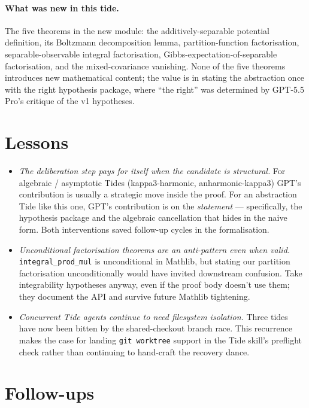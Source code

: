\documentclass[11pt]{article}
\begin{document}
\paragraph{What was new in this tide.} The five theorems in the new
module: the additively-separable potential definition, its Boltzmann
decomposition lemma, partition-function factorisation,
separable-observable integral factorisation,
Gibbs-expectation-of-separable factorisation, and the mixed-covariance
vanishing. None of the five theorems introduces new mathematical
content; the value is in stating the abstraction once with the right
hypothesis package, where ``the right'' was determined by GPT-5.5 Pro's
critique of the v1 hypotheses.

\section{Lessons}

\begin{itemize}
\item \emph{The deliberation step pays for itself when the candidate
is structural.} For algebraic / asymptotic Tides (kappa3-harmonic,
anharmonic-kappa3) GPT's contribution is usually a strategic move
inside the proof. For an abstraction Tide like this one, GPT's
contribution is on the \emph{statement} --- specifically, the
hypothesis package and the algebraic cancellation that hides in the
naive form. Both interventions saved follow-up cycles in the
formalisation.

\item \emph{Unconditional factorisation theorems are an anti-pattern
even when valid.} \texttt{integral\_prod\_mul} is unconditional in
Mathlib, but stating our partition factorisation unconditionally
would have invited downstream confusion. Take integrability
hypotheses anyway, even if the proof body doesn't use them; they
document the API and survive future Mathlib tightening.

\item \emph{Concurrent Tide agents continue to need filesystem
isolation.} Three tides have now been bitten by the
shared-checkout branch race. This recurrence makes the case for
landing \texttt{git worktree} support in the Tide skill's preflight
check rather than continuing to hand-craft the recovery dance.
\end{itemize}

\section{Follow-ups}
\end{document}

